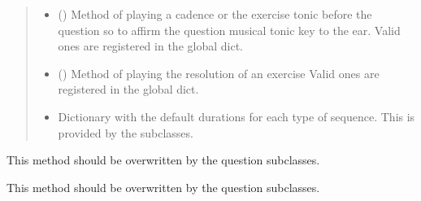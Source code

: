 \documentclass[letterpaper,10pt,english]{sphinxmanual}
\begin{document}
\begin{fulllineitems}
\begin{fulllineitems}
\begin{quote}
\begin{description}
\begin{itemize}
\item {} 
 () \textendash{} Method of playing a cadence or the
exercise tonic before the question so to affirm the question
musical tonic key to the ear. Valid ones are registered in the
 global dict.

\item {} 
 () \textendash{} Method of playing the resolution of an
exercise Valid ones are registered in the
 global dict.

\item {} 
 \textendash{} Dictionary with the default durations for
each type of sequence. This is provided by the subclasses.

\end{itemize}

\end{description}\end{quote}

\end{fulllineitems}


\begin{fulllineitems}
\label{\detokenize{index:birdears.questionbase.QuestionBase.check_question}}
This method should be overwritten by the question subclasses.

\end{fulllineitems}


\begin{fulllineitems}
\label{\detokenize{index:birdears.questionbase.QuestionBase.make_question}}
This method should be overwritten by the question subclasses.

\end{fulllineitems}


\end{fulllineitems}
\end{document}
